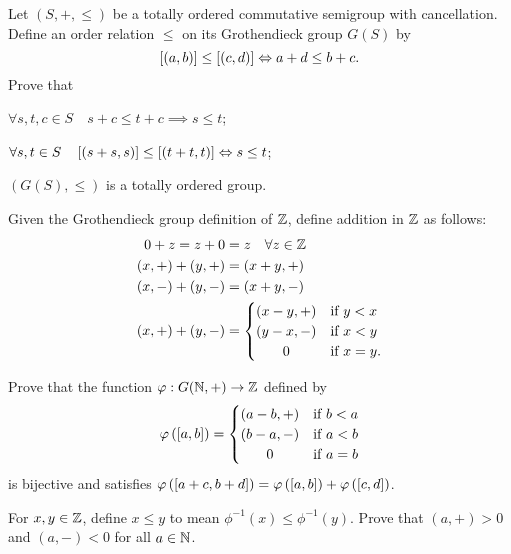 \documentclass[master.tex]{subfiles}
\begin{document}
\begin{exercises}
    \item Let $(S, +, \leq)$ be a totally ordered commutative semigroup with cancellation.
    Define an order relation $\leq$ on its Grothendieck group $G(S)$ by
    \[
        \left[ (a, b) \right] \leq \left[ (c, d) \right] \Leftrightarrow a + d \leq b + c
    .\]
    Prove that
    \begin{exercises}
        \item $\forall s, t, c \in S \quad s + c \leq t + c \implies s \leq t$;
        \item $\forall s,t \in S \quad \left[ (s + s, s) \right] \leq \left[ (t + t, t) \right] \Leftrightarrow s \leq t$;
        \item $(G(S), \leq)$ is a totally ordered group.
    \end{exercises}
    
    \item Given the Grothendieck group definition of $\mathbb{Z}$, define addition in $\mathbb{Z}$ as follows:
    \begin{align*}
        0 + z = z + 0 &= z \quad \forall z \in \Z \\
        (x, +) + (y, +) &= (x + y, +) \\
        (x, -) + (y, -) &= (x + y, -) \\
        (x, +) + (y, -) &=
        \begin{cases}
            (x - y, +) &\text{if } y < x \\
            (y - x, -) &\text{if } x < y \\
            \hfil 0 &\text{if } x = y.
        \end{cases}
    \end{align*}
    \begin{exercises}
        \item Prove that the function $\varphi : G(\mathbb{N}, +) \rightarrow \mathbb{Z}$ defined by
        \[
            \phi\left(\eqclass{a, b}\right) =
            \begin{cases}
                (a - b, +) &\text{if } b < a \\
                (b - a, -) &\text{if } a < b \\
                \hfil 0 &\text{if } a = b
            \end{cases}
        \]
        is bijective and satisfies $\varphi\left(\left[ a + c, b + d \right]\right) = \varphi\left(\left[ a, b \right]\right) + \varphi\left(\left[ c, d \right]\right)$.

        \item For $x, y \in \mathbb{Z}$, define $x \leq y$ to mean $\phi^{-1}(x) \leq \phi^{-1}(y)$.
        Prove that $(a, +) > 0$ and $(a, -) < 0$ for all $a \in \mathbb{N}$.
    \end{exercises}


\end{exercises}
\end{document}
